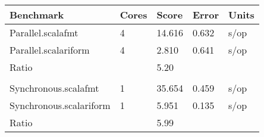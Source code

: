 \begin{tabular}{lllll}
  Benchmark                &  Cores  &   Score  &   Error &  Units\\
  \hline
  \hline
  Parallel.scalafmt        &  4      &  14.616  &   0.632 &   s/op\\
  Parallel.scalariform     &  4      &   2.810  &   0.641 &   s/op\\
\hline
  Ratio &  & 5.20 &  & \\
  \\
  Synchronous.scalafmt     &  1      &  35.654  &   0.459 &   s/op\\
  Synchronous.scalariform  &  1      &   5.951  &   0.135 &   s/op\\
\hline
  Ratio &  & 5.99 &  & 
\end{tabular}
